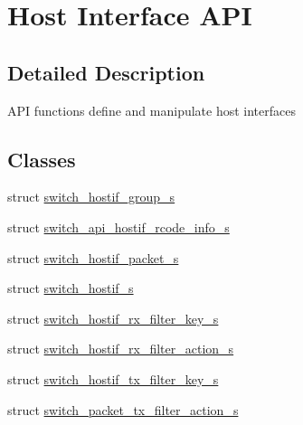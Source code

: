 \hypertarget{group__HostInterface}{\section{Host Interface A\+P\+I}
\label{group__HostInterface}
}


\subsection{Detailed Description}
A\+P\+I functions define and manipulate host interfaces \subsection*{Classes}
\begin{DoxyCompactItemize}
\item 
struct \hyperlink{structswitch__hostif__group__s}{switch\+\_\+hostif\+\_\+group\+\_\+s}
\item 
struct \hyperlink{structswitch__api__hostif__rcode__info__s}{switch\+\_\+api\+\_\+hostif\+\_\+rcode\+\_\+info\+\_\+s}
\item 
struct \hyperlink{structswitch__hostif__packet__s}{switch\+\_\+hostif\+\_\+packet\+\_\+s}
\item 
struct \hyperlink{structswitch__hostif__s}{switch\+\_\+hostif\+\_\+s}
\item 
struct \hyperlink{structswitch__hostif__rx__filter__key__s}{switch\+\_\+hostif\+\_\+rx\+\_\+filter\+\_\+key\+\_\+s}
\item 
struct \hyperlink{structswitch__hostif__rx__filter__action__s}{switch\+\_\+hostif\+\_\+rx\+\_\+filter\+\_\+action\+\_\+s}
\item 
struct \hyperlink{structswitch__hostif__tx__filter__key__s}{switch\+\_\+hostif\+\_\+tx\+\_\+filter\+\_\+key\+\_\+s}
\item 
struct \hyperlink{structswitch__packet__tx__filter__action__s}{switch\+\_\+packet\+\_\+tx\+\_\+filter\+\_\+action\+\_\+s}
\end{DoxyCompactItemize}
